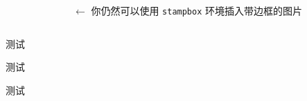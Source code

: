 \documentclass{ctexbeamer}
\begin{document}
\begin{frame}[fragile]
\begin{columns}
\begin{column}{0.45\textwidth}
      \begin{columns}[b]
        \begin{column}{.5\textwidth}
          \begin{stampbox}
          \end{stampbox}
        \end{column}
        \begin{column}{.5\textwidth}
          $\leftarrow$ 你仍然可以使用 \texttt{stampbox} 环境插入带边框的图片\vspace{1ex}
          \stamphrule
        \end{column}
      \end{columns}
    \end{column}
  \end{columns}
\end{frame}
\title{}
\author{}
\logo{}
\institute[]{}
\begin{frame}
  \begin{columns}

    \begin{column}{.5\textwidth}
      \begin{stampblock}{测试}
        \zhlipsum[1]
      \end{stampblock}

      \begin{stampblock}{测试}
        \zhlipsum[2]
      \end{stampblock}

      \vspace*{0.5ex}

      \begin{stampblock}{测试}
        \zhlipsum[3]
      \end{stampblock}
    \end{column}

  \end{columns}

\end{frame}
\end{document}

